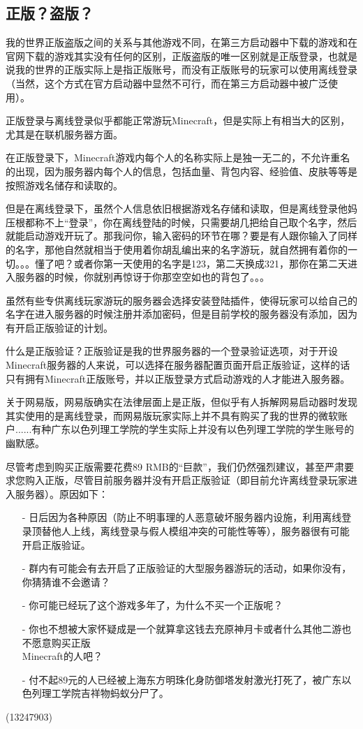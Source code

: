 \documentclass[UTF8,a4paper]{article}
\begin{document}
		\subsection{正版？盗版？}
			\hypertarget{zhengbandaoban}{}
			\par 我的世界正版盗版之间的关系与其他游戏不同，在第三方启动器中下载的游戏和在官网下载的游戏其实没有任何的区别，正版盗版的唯一区别就是正版登录，也就是说我的世界的正版实际上是指正版账号，而没有正版账号的玩家可以使用离线登录（当然，这个方式在官方启动器中显然不可行，而在第三方启动器中被广泛使用）。
			\par 正版登录与离线登录似乎都能正常游玩Minecraft，但是实际上有相当大的区别，尤其是在联机服务器方面。
			\par 在正版登录下，Minecraft游戏内每个人的名称实际上是独一无二的，不允许重名的出现，因为服务器内每个人的信息，包括血量、背包内容、经验值、皮肤等等是按照游戏名储存和读取的。
			\par 但是在离线登录下，虽然个人信息依旧根据游戏名存储和读取，但是离线登录他妈压根都称不上“登录”，你在离线登陆的时候，只需要胡几把给自己取个名字，然后就能启动游戏开玩了。那我问你，输入密码的环节在哪？要是有人跟你输入了同样的名字，那他自然就相当于使用着你胡乱编出来的名字游玩，就自然拥有着你的一切。。。懂了吧？或者你第一天使用的名字是123，第二天换成321，那你在第二天进入服务器的时候，你就别再惊讶于你那空空如也的背包了。。。
			\par 虽然有些专供离线玩家游玩的服务器会选择安装登陆插件，使得玩家可以给自己的名字在进入服务器的时候注册并添加密码，但是目前学校的服务器没有添加，因为有开启正版验证的计划。
			\par 什么是正版验证？正版验证是我的世界服务器的一个登录验证选项，对于开设Minecraft服务器的人来说，可以选择在服务器配置页面开启正版验证，这样的话只有拥有Minecraft正版账号，并以正版登录方式启动游戏的人才能进入服务器。
			\par 关于网易版，网易版确实在法律层面上是正版，但似乎有人拆解网易启动器时发现其实使用的是离线登录，而网易版玩家实际上并不具有购买了我的世界的微软账户......有种广东以色列理工学院的学生实际上并没有以色列理工学院的学生账号的幽默感。
			\par 尽管考虑到购买正版需要花费89 RMB的“巨款”，我们仍然强烈建议，甚至严肃要求您购入正版，尽管目前服务器并没有开启正版验证（即目前允许离线登录玩家进入服务器）。原因如下：
			\begin{itemize}
				\item[-] 日后因为各种原因（防止不明事理的人恶意破坏服务器内设施，利用离线登录顶替他人上线，离线登录与假人模组冲突的可能性等等），服务器很有可能开启正版验证。
				\item[-] 群内有可能会有去开启了正版验证的大型服务器游玩的活动，如果你没有，你猜猜谁不会邀请？
				\item[-] 你可能已经玩了这个游戏多年了，为什么不买一个正版呢？
				\item[-] 你也不想被大家怀疑成是一个就算拿这钱去充原神月卡或者什么其他二游也不愿意购买正版 \\ Minecraft的人吧？
				\item[-] 付不起89元的人已经被上海东方明珠化身防御塔发射激光打死了，被广东以色列理工学院吉祥物蚂蚁分尸了。
			\end{itemize}
			\begin{flushright}(13247903)\end{flushright}
\end{document}
